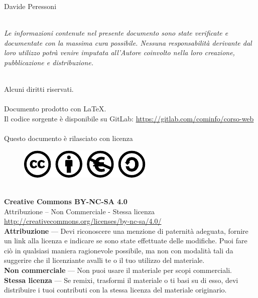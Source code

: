  Davide Peressoni\\~\par
    \emph{Le informazioni contenute nel presente documento sono state verificate e documentate con la massima cura possibile. Nessuna responsabilità derivante dal loro utilizzo potrà venire imputata all’Autore coinvolto nella loro creazione, pubblicazione e distribuzione.}\\~\par
    Alcuni diritti riservati.\\~\\
    Documento prodotto con \LaTeX.\\
    Il codice sorgente è disponibile su GitLab: \url{https://gitlab.com/cominfo/corso-web}\\~\\
    Questo documento è rilasciato con licenza\\
    \begin{figure}[!ht]
	\centering
	    \includegraphics{CC.pdf}
    \end{figure}~\\
    \textbf{Creative Commons BY-NC-SA 4.0}\\
    Attribuzione – Non Commerciale - Stessa licenza\\
    \url{http://creativecommons.org/licenses/by-nc-sa/4.0/}\\
    \textbf{Attribuzione} — Devi riconoscere una menzione di paternità adeguata, fornire un link alla licenza e indicare se sono state effettuate delle modifiche. Puoi
    fare ciò in qualsiasi maniera ragionevole possibile, ma non con modalità tali da suggerire che il licenziante avalli te o il tuo utilizzo del materiale.\\
    \textbf{Non commerciale} — Non puoi usare il materiale per scopi commerciali.\\
    \textbf{Stessa licenza} — Se remixi, trasformi il materiale o ti basi su di esso, devi distribuire i tuoi contributi con la stessa licenza del materiale originario.
